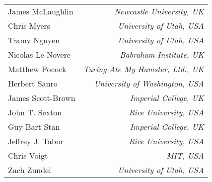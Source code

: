 \documentclass[finalspec]{sbmlpkgspec}
\newcommand{\tododeferred}[1]{\todo[color=cyan, inline]{#1}}
\begin{document}
{\begin{tabular}{l>{\hspace*{15pt}}r}
James McLaughlin & \emph{Newcastle University, UK}\\
Chris Myers & \emph{University of Utah, USA}\\
Tramy Nguyen & \emph{University of Utah, USA}\\
Nicolas Le Novere & \emph{Babraham Institute, UK}\\
Matthew Pocock & \emph{Turing Ate My Hamster, Ltd., UK}\\
Herbert Sauro & \emph{University of Washington, USA}\\
James Scott-Brown & \emph{Imperial College, UK}\\
John T. Sexton & \emph{Rice University, USA}\\
Guy-Bart Stan & \emph{Imperial College, UK}\\
Jeffrey J. Tabor & \emph{Rice University, USA}\\
Chris Voigt & \emph{MIT, USA}\\
Zach Zundel & \emph{University of Utah, USA}\\
\end{tabular}
}

\maketitlepage

\maketableofcontents














\appendix
\appendixlabels







\newpage
\label{s:bibliography}

\end{document}
